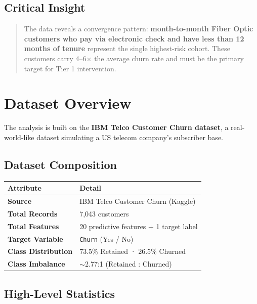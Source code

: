 \documentclass[11pt,a4paper]{article}
\begin{document}
\subsection{Critical Insight}

\begin{quote}
The data reveals a convergence pattern: \textbf{month-to-month Fiber Optic customers who pay via electronic check and have less than 12 months of tenure} represent the single highest-risk cohort. These customers carry 4–6$\times$ the average churn rate and must be the primary target for Tier 1 intervention.
\end{quote}

\hr

\section{Dataset Overview}

The analysis is built on the \textbf{IBM Telco Customer Churn dataset}, a real-world-like dataset simulating a US telecom company's subscriber base.

\subsection{Dataset Composition}

\begin{table}[h!]
\centering
\begin{tabularx}{\textwidth}{l X}
\toprule
\textbf{Attribute} & \textbf{Detail} \\
\midrule
\textbf{Source} & IBM Telco Customer Churn (Kaggle) \\
\textbf{Total Records} & 7,043 customers \\
\textbf{Total Features} & 20 predictive features + 1 target label \\
\textbf{Target Variable} & \texttt{Churn} (Yes / No) \\
\textbf{Class Distribution} & 73.5\% Retained · 26.5\% Churned \\
\textbf{Class Imbalance} & $\sim$2.77:1 (Retained : Churned) \\
\bottomrule
\end{tabularx}
\end{table}

\subsection{High-Level Statistics}
\end{document}
